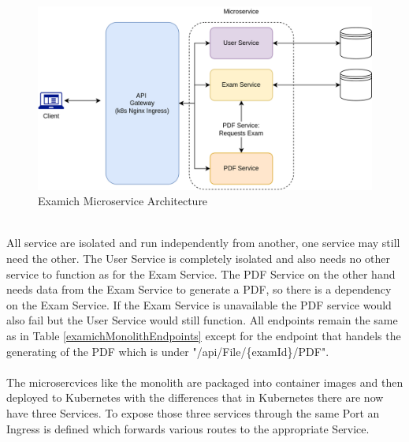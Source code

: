 \documentclass[BIF,Bachelor,nenglish]{twbook}%
\begin{document}
\begin{figure} [H]
 \begin{center}
    \includegraphics[width=1\linewidth]{img/ExamichMicroserviceArchitecture.png}
 \end{center}
 \caption{Examich Microservice Architecture}
 \label{examichMicroservice}
\end{figure}
\noindent
\\
All service are isolated and run independently from another, one service may still need the other. The User Service is completely isolated and also needs no other service to function as for the Exam Service. The PDF Service on the other hand needs data from the Exam Service to generate a PDF, so there is a dependency on the Exam Service. If the Exam Service is unavailable the PDF service would also fail but the User Service would still function. All endpoints remain the same as in Table \ref{examichMonolithEndpoints} except for the endpoint that handels the generating of the PDF which is under "/api/File/\{examId\}/PDF".
\\
\\
\noindent
The microsercvices like the monolith are packaged into container images and then deployed to Kubernetes with the differences that in Kubernetes there are now have three Services. To expose those three services through the same Port  an Ingress is defined which forwards various routes to the appropriate Service.
\end{document}
